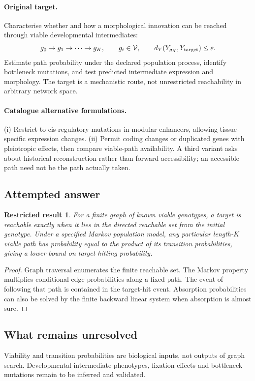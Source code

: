 \documentclass[11pt]{article}
\newtheorem{attemptresult}{Restricted result}[section]
\begin{document}
\paragraph{Original target.}
Characterise whether and how a morphological innovation can be reached through viable developmental intermediates:
\[
 g_0\to g_1\to\cdots\to g_K,
\qquad g_i\in\mathcal V,
\qquad d_Y(Y_{g_K},Y_{\rm target})\leq\varepsilon.
\]
Estimate path probability under the declared population process, identify bottleneck mutations, and test predicted intermediate expression and morphology. The target is a mechanistic route, not unrestricted reachability in arbitrary network space.
\paragraph{Catalogue alternative formulations.}
(i) Restrict to cis-regulatory mutations in modular enhancers, allowing tissue-specific expression changes. (ii) Permit coding changes or duplicated genes with pleiotropic effects, then compare viable-path availability. A third variant asks about historical reconstruction rather than forward accessibility; an accessible path need not be the path actually taken.
\subsection{Attempted answer}
\begin{attemptresult}
For a finite graph of known viable genotypes, a target is reachable exactly when it lies in the directed reachable set from the initial genotype. Under a specified Markov population model, any particular length-$K$ viable path has probability equal to the product of its transition probabilities, giving a lower bound on target hitting probability.
\end{attemptresult}
\begin{proof}
Graph traversal enumerates the finite reachable set. The Markov property multiplies conditional edge probabilities along a fixed path. The event of following that path is contained in the target-hit event. Absorption probabilities can also be solved by the finite backward linear system when absorption is almost sure.
\end{proof}
\subsection{What remains unresolved}
Viability and transition probabilities are biological inputs, not outputs of graph search. Developmental intermediate phenotypes, fixation effects and bottleneck mutations remain to be inferred and validated.
\end{document}

